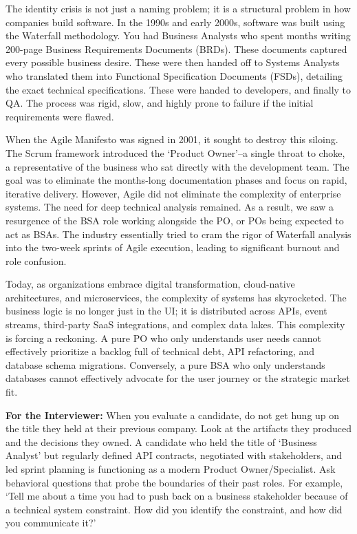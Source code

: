 \documentclass[
  11pt,
  openany,
  oneside]{book}
\renewenvironment{quote}{\begin{customquote}}{\end{customquote}}
\begin{document}
The identity crisis is not just a naming problem; it is a structural
problem in how companies build software. In the 1990s and early 2000s,
software was built using the Waterfall methodology. You had Business
Analysts who spent months writing 200-page Business Requirements
Documents (BRDs). These documents captured every possible business
desire. These were then handed off to Systems Analysts who translated
them into Functional Specification Documents (FSDs), detailing the exact
technical specifications. These were handed to developers, and finally
to QA. The process was rigid, slow, and highly prone to failure if the
initial requirements were flawed.

When the Agile Manifesto was signed in 2001, it sought to destroy this
siloing. The Scrum framework introduced the `Product Owner'--a single
throat to choke, a representative of the business who sat directly with
the development team. The goal was to eliminate the months-long
documentation phases and focus on rapid, iterative delivery. However,
Agile did not eliminate the complexity of enterprise systems. The need
for deep technical analysis remained. As a result, we saw a resurgence
of the BSA role working alongside the PO, or POs being expected to act
as BSAs. The industry essentially tried to cram the rigor of Waterfall
analysis into the two-week sprints of Agile execution, leading to
significant burnout and role confusion.

Today, as organizations embrace digital transformation, cloud-native
architectures, and microservices, the complexity of systems has
skyrocketed. The business logic is no longer just in the UI; it is
distributed across APIs, event streams, third-party SaaS integrations,
and complex data lakes. This complexity is forcing a reckoning. A pure
PO who only understands user needs cannot effectively prioritize a
backlog full of technical debt, API refactoring, and database schema
migrations. Conversely, a pure BSA who only understands databases cannot
effectively advocate for the user journey or the strategic market fit.

\begin{quote}
\textbf{For the Interviewer:} When you evaluate a candidate, do not get
hung up on the title they held at their previous company. Look at the
artifacts they produced and the decisions they owned. A candidate who
held the title of `Business Analyst' but regularly defined API
contracts, negotiated with stakeholders, and led sprint planning is
functioning as a modern Product Owner/Specialist. Ask behavioral
questions that probe the boundaries of their past roles. For example,
`Tell me about a time you had to push back on a business stakeholder
because of a technical system constraint. How did you identify the
constraint, and how did you communicate it?'
\end{quote}
\end{document}
